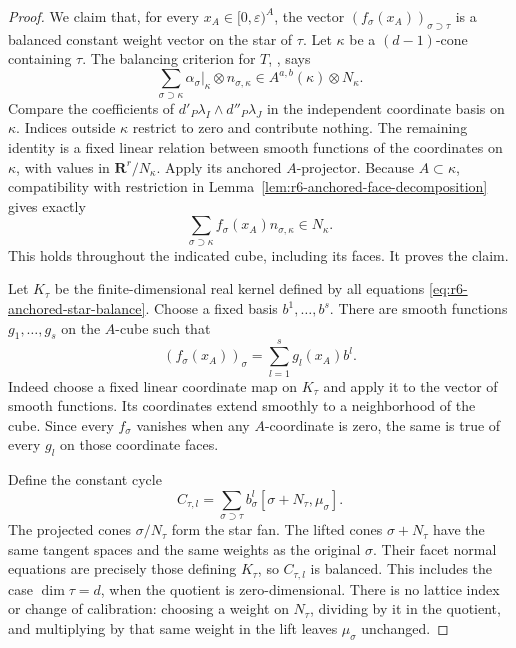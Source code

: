 \documentclass[11pt,a4paper]{article}
\numberwithin{equation}{section}
\theoremstyle{definition}
\theoremstyle{remark}
\begin{document}
\begin{proof}
We claim that, for every $x_A\in[0,\varepsilon)^A$, the vector
$(f_\sigma(x_A))_{\sigma\supset\tau}$ is a balanced constant
weight vector on the star of $\tau$.  Let $\kappa$ be a
$(d-1)$-cone containing $\tau$.  The balancing criterion for
$T$, \cite[Definition~3.2 and Theorem~3.3]{Mih23}, says
\[
    \sum_{\sigma\supset\kappa}
         \alpha_\sigma|_\kappa\otimes n_{\sigma,\kappa}
                 \in A^{a,b}(\kappa)\otimes N_\kappa.
\]
Compare the coefficients of
$d'_P\lambda_I\wedge d''_P\lambda_J$ in the independent
coordinate basis on $\kappa$.  Indices outside $\kappa$
restrict to zero and contribute nothing.  The remaining
identity is a fixed linear relation between smooth functions
of the coordinates on $\kappa$, with values in
$\mathbf R^r/N_\kappa$.  Apply its anchored $A$-projector.
Because $A\subset\kappa$, compatibility with restriction in
Lemma~\ref{lem:r6-anchored-face-decomposition} gives exactly
\begin{equation}
           \sum_{\sigma\supset\kappa}
                      f_\sigma(x_A)n_{\sigma,\kappa}
                                \in N_\kappa.
 \label{eq:r6-anchored-star-balance}
\end{equation}
This holds throughout the indicated cube, including its faces.
It proves the claim.

Let $K_\tau$ be the finite-dimensional real kernel defined by
all equations \eqref{eq:r6-anchored-star-balance}.  Choose a
fixed basis $b^1,\ldots,b^s$.  There are smooth functions
$g_1,\ldots,g_s$ on the $A$-cube such that
\[
                    (f_\sigma(x_A))_\sigma
                                  =\sum_{l=1}^s g_l(x_A)b^l.
\]
Indeed choose a fixed linear coordinate map on $K_\tau$ and
apply it to the vector of smooth functions.  Its coordinates
extend smoothly to a neighborhood of the cube.  Since every
$f_\sigma$ vanishes when any $A$-coordinate is zero, the same
is true of every $g_l$ on those coordinate faces.

Define the constant cycle
\[
                      C_{\tau,l}
                         =\sum_{\sigma\supset\tau}
                              b^l_\sigma
                                  [\sigma+N_\tau,\mu_\sigma].
\]
The projected cones $\sigma/N_\tau$ form the star fan.
The lifted cones $\sigma+N_\tau$ have the same tangent
spaces and the same weights as the original $\sigma$.
Their facet normal equations are precisely those defining
$K_\tau$, so $C_{\tau,l}$ is balanced.  This includes the
case $\dim\tau=d$, when the quotient is zero-dimensional.
There is no lattice index or change of calibration: choosing
a weight on $N_\tau$, dividing by it in the quotient, and
multiplying by that same weight in the lift leaves
$\mu_\sigma$ unchanged.


\end{proof}
\end{document}
